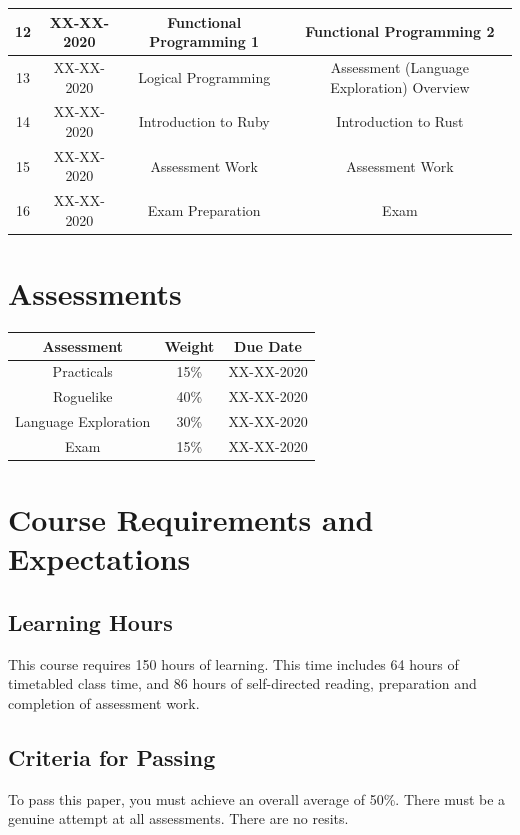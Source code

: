 \documentclass{article}
\begin{document}
\begin{tabular}{|c|c|c|c|}
  12            & XX-XX-2020    & Functional Programming 1              & Functional Programming 2                   \\ \hline
  13            & XX-XX-2020    & Logical Programming                   & Assessment (Language Exploration) Overview \\ \hline
  14            & XX-XX-2020    & Introduction to Ruby                  & Introduction to Rust                       \\ \hline
  15            & XX-XX-2020    & Assessment Work                       & Assessment Work                            \\ \hline
  16            & XX-XX-2020    & Exam Preparation                      & Exam                                       \\ \hline
\end{tabular}

\section*{Assessments}
\renewcommand{\arraystretch}{1.5}
\begin{tabular}{|c|c|c|}
  \hline
  \textbf{Assessment}  & \textbf{Weight} & \textbf{Due Date} \\ \hline
  Practicals           & 15\%            & XX-XX-2020        \\ \hline
  Roguelike            & 40\%            & XX-XX-2020        \\ \hline
  Language Exploration & 30\%            & XX-XX-2020        \\ \hline
  Exam                 & 15\%            & XX-XX-2020        \\ \hline
\end{tabular}

\section*{Course Requirements and Expectations}

\subsection*{Learning Hours}
This course requires 150 hours of learning. This time includes 64 hours of timetabled class time, and 86 hours of self-directed reading, preparation and completion of assessment work.

\subsection*{Criteria for Passing}
To pass this paper, you must achieve an overall average of 50\%. There must be a genuine attempt at all assessments. There are no resits.
\end{document}
